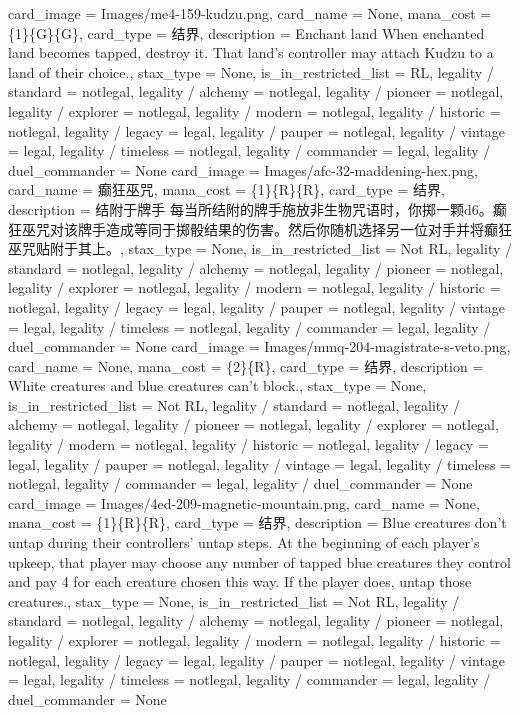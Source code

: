 \documentclass[lang = cn, color = black, 10pt]{AllThatStax}
\begin{document}
\card
{
	card_image = Images/me4-159-kudzu.png,
	card_name = None,
	mana_cost = \{1\}\{G\}\{G\},
	card_type = 结界,
	description = Enchant land
	When enchanted land becomes tapped, destroy it. That land's controller may attach Kudzu to a land of their choice.,
	stax_type = None,
	is_in_restricted_list = RL,
	legality / standard = notlegal,
	legality / alchemy = notlegal,
	legality / pioneer = notlegal,
	legality / explorer = notlegal,
	legality / modern = notlegal,
	legality / historic = notlegal,
	legality / legacy = legal,
	legality / pauper = notlegal,
	legality / vintage = legal,
	legality / timeless = notlegal,
	legality / commander = legal,
	legality / duel_commander = None
}
\card
{
	card_image = Images/afc-32-maddening-hex.png,
	card_name = 癫狂巫咒,
	mana_cost = \{1\}\{R\}\{R\},
	card_type = 结界,
	description = 结附于牌手
	每当所结附的牌手施放非生物咒语时，你掷一颗d6。癫狂巫咒对该牌手造成等同于掷骰结果的伤害。然后你随机选择另一位对手并将癫狂巫咒贴附于其上。,
	stax_type = None,
	is_in_restricted_list = Not RL,
	legality / standard = notlegal,
	legality / alchemy = notlegal,
	legality / pioneer = notlegal,
	legality / explorer = notlegal,
	legality / modern = notlegal,
	legality / historic = notlegal,
	legality / legacy = legal,
	legality / pauper = notlegal,
	legality / vintage = legal,
	legality / timeless = notlegal,
	legality / commander = legal,
	legality / duel_commander = None
}
\card
{
	card_image = Images/mmq-204-magistrate-s-veto.png,
	card_name = None,
	mana_cost = \{2\}\{R\},
	card_type = 结界,
	description = White creatures and blue creatures can't block.,
	stax_type = None,
	is_in_restricted_list = Not RL,
	legality / standard = notlegal,
	legality / alchemy = notlegal,
	legality / pioneer = notlegal,
	legality / explorer = notlegal,
	legality / modern = notlegal,
	legality / historic = notlegal,
	legality / legacy = legal,
	legality / pauper = notlegal,
	legality / vintage = legal,
	legality / timeless = notlegal,
	legality / commander = legal,
	legality / duel_commander = None
}
\card
{
	card_image = Images/4ed-209-magnetic-mountain.png,
	card_name = None,
	mana_cost = \{1\}\{R\}\{R\},
	card_type = 结界,
	description = Blue creatures don't untap during their controllers' untap steps.
	At the beginning of each player's upkeep, that player may choose any number of tapped blue creatures they control and pay {4} for each creature chosen this way. If the player does, untap those creatures.,
	stax_type = None,
	is_in_restricted_list = Not RL,
	legality / standard = notlegal,
	legality / alchemy = notlegal,
	legality / pioneer = notlegal,
	legality / explorer = notlegal,
	legality / modern = notlegal,
	legality / historic = notlegal,
	legality / legacy = legal,
	legality / pauper = notlegal,
	legality / vintage = legal,
	legality / timeless = notlegal,
	legality / commander = legal,
	legality / duel_commander = None
}
\end{document}

